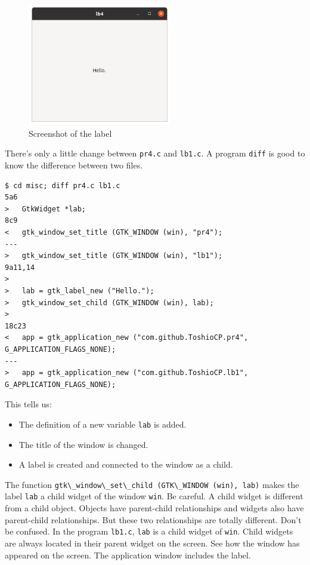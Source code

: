 \begin{figure}
\centering
\includegraphics[width=6.3cm,height=5.325cm]{../image/screenshot_lb1.png}
\caption{Screenshot of the label}
\end{figure}

There's only a little change between \passthrough{\lstinline!pr4.c!} and
\passthrough{\lstinline!lb1.c!}. A program
\passthrough{\lstinline!diff!} is good to know the difference between
two files.

\begin{lstlisting}
$ cd misc; diff pr4.c lb1.c
5a6
>   GtkWidget *lab;
8c9
<   gtk_window_set_title (GTK_WINDOW (win), "pr4");
---
>   gtk_window_set_title (GTK_WINDOW (win), "lb1");
9a11,14
> 
>   lab = gtk_label_new ("Hello.");
>   gtk_window_set_child (GTK_WINDOW (win), lab);
> 
18c23
<   app = gtk_application_new ("com.github.ToshioCP.pr4", G_APPLICATION_FLAGS_NONE);
---
>   app = gtk_application_new ("com.github.ToshioCP.lb1", G_APPLICATION_FLAGS_NONE);
\end{lstlisting}

This tells us:

\begin{itemize}
\tightlist
\item
  The definition of a new variable \passthrough{\lstinline!lab!} is
  added.
\item
  The title of the window is changed.
\item
  A label is created and connected to the window as a child.
\end{itemize}

The function
\passthrough{\lstinline!gtk\_window\_set\_child (GTK\_WINDOW (win), lab)!}
makes the label \passthrough{\lstinline!lab!} a child widget of the
window \passthrough{\lstinline!win!}. Be careful. A child widget is
different from a child object. Objects have parent-child relationships
and widgets also have parent-child relationships. But these two
relationships are totally different. Don't be confused. In the program
\passthrough{\lstinline!lb1.c!}, \passthrough{\lstinline!lab!} is a
child widget of \passthrough{\lstinline!win!}. Child widgets are always
located in their parent widget on the screen. See how the window has
appeared on the screen. The application window includes the label.

